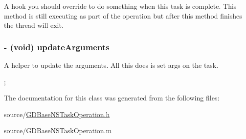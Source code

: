 A hook you should override to do something when this task is complete. This method is still executing as part of the operation but after this method finishes the thread will exit. \hypertarget{interface_g_d_base_n_s_task_operation_afc56ea01eb11b30932f054a482b9c1e0}{
\subsubsection[{updateArguments}]{\setlength{\rightskip}{0pt plus 5cm}-\/ (void) updateArguments }}
\label{interface_g_d_base_n_s_task_operation_afc56ea01eb11b30932f054a482b9c1e0}


A helper to update the arguments. All this does is set args on the task.


\begin{DoxyCode}
 ;
\end{DoxyCode}
 

The documentation for this class was generated from the following files:\begin{DoxyCompactItemize}
\item 
source/\hyperlink{_g_d_base_n_s_task_operation_8h}{GDBaseNSTaskOperation.h}\item 
source/GDBaseNSTaskOperation.m\end{DoxyCompactItemize}

